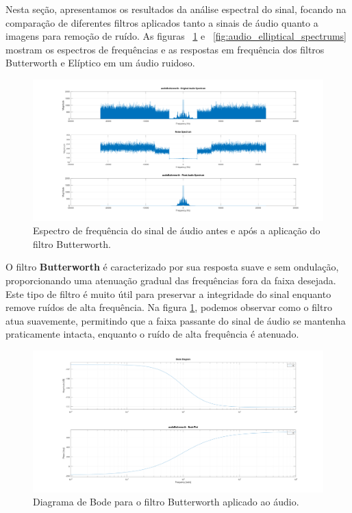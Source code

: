 Nesta seção, apresentamos os resultados da análise espectral do sinal, focando na comparação de diferentes filtros aplicados tanto a sinais de áudio quanto a imagens para remoção de ruído. As figuras ~\ref{fig:audio_butterworth_spectrums} e ~\ref{fig:audio_elliptical_spectrums} mostram os espectros de frequências e as respostas em frequência dos filtros Butterworth e Elíptico em um áudio ruidoso.

\begin{figure}[H]
    \centering
    \includegraphics[width=1\linewidth]{03_results/assets/audio_butterworth_spectrums.png}
    \caption{Espectro de frequência do sinal de áudio antes e após a aplicação do filtro Butterworth.}
    \label{fig:audio_butterworth_spectrums}
\end{figure}

O filtro \textbf{Butterworth} é caracterizado por sua resposta suave e sem ondulação, proporcionando uma atenuação gradual das frequências fora da faixa desejada. Este tipo de filtro é muito útil para preservar a integridade do sinal enquanto remove ruídos de alta frequência. Na figura \ref{fig:audio_butterworth_spectrums}, podemos observar como o filtro atua suavemente, permitindo que a faixa passante do sinal de áudio se mantenha praticamente intacta, enquanto o ruído de alta frequência é atenuado.

\begin{figure}[H]
    \centering
    \includegraphics[width=1\linewidth]{03_results/assets/audio_butterworth_bode.png}
    \caption{Diagrama de Bode para o filtro Butterworth aplicado ao áudio.}
    \label{fig:audio_butterworth_bode}
\end{figure}

